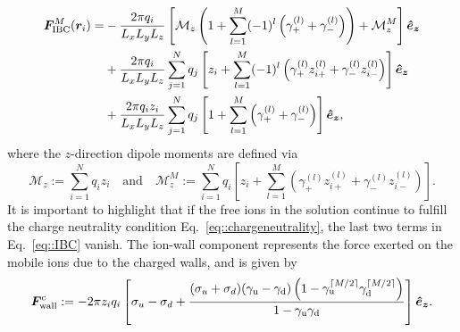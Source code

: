\begin{equation}\label{eq::IBC}
\begin{split}
\bm{F}_{\text{IBC}}^{M}(\bm{r}_i)=&-\frac{2\pi q_{i}}{L_xL_yL_z}\left[\mathcal{M}_{z}\left(1+\sum_{l=1}^{M}(-1)^{l}\left(\gamma_{+}^{(l)}+\gamma_{-}^{(l)}\right)\right)+\mathcal{M}_{z}^{M}\right]\boldsymbol{\hat e_z}\\
&+\frac{2\pi q_i}{L_xL_yL_z}\sum_{j=1}^{N}q_j\left[z_i+\sum_{l=1}^{M}(-1)^{l}\left(\gamma_{+}^{(l)}z_{i+}^{(l)}+\gamma_{-}^{(l)}z_{i-}^{(l)}\right)\right]\boldsymbol{\hat e_z}\\
&+\frac{2\pi q_iz_i}{L_xL_yL_z}\sum_{j=1}^{N}q_j\left[1+\sum_{l=1}^{M}\left(\gamma_{+}^{(l)}+\gamma_{-}^{(l)}\right)\right]\boldsymbol{\hat e_z},
\end{split}
\end{equation}
where the $z$-direction dipole moments are defined via
\begin{equation}
\mathcal{M}_{z}:=\sum_{i=1}^{N}q_iz_i\quad\text{and}\quad \mathcal{M}_{z}^{M}:=\sum_{i=1}^{N}q_i\left[z_{i}+\sum_{l=1}^{M}\left(\gamma_{+}^{(l)}z_{i+}^{(l)}+\gamma_{-}^{(l)}z_{i-}^{(l)}\right)\right].
\end{equation}
It is important to highlight that if the free ions in the solution continue to fulfill the charge neutrality condition Eq.~\eqref{eq::chargeneutrality}, the last two terms in Eq.~\eqref{eq::IBC} vanish. 
The ion-wall component represents the force exerted on the mobile ions due to the charged walls, and is given by
\begin{equation}
\bm{F}_{\text{wall}}^{\text{c}}:=-2\pi z_{i}q_{i}\left[\sigma_u-\sigma_d+\frac{(\sigma_u+\sigma_d)(\gamma_{\mathrm{u}}-\gamma_{\mathrm{d}})\left(1-\gamma_{\mathrm{u}}^{\lceil M/2 \rceil}\gamma_{\mathrm{d}}^{\lceil M/2 \rceil}\right)}{1-\gamma_{\mathrm{u}}\gamma_{\mathrm{d}}}\right]\boldsymbol{\hat e_z}.
\end{equation}